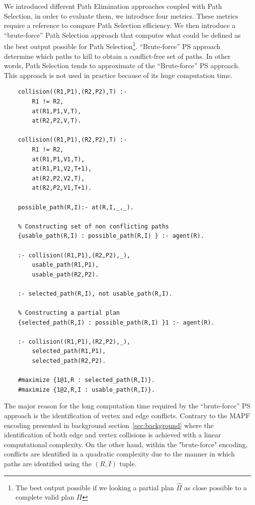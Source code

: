 We introduced different Path Elimination approaches coupled with Path  Selection, in order to evaluate them, we introduce four metrics. These metrics require a reference to compare Path Selection efficiency. We then introduce a ``brute-force'' Path Selection approach that computes what could be defined as the best output possible for Path Selection\footnote{The best output possible if we looking a partial plan \(\hat{\Pi}\) as close possible to a complete valid plan \(\Pi\)}. ``Brute-force'' PS approach determine which paths to kill to obtain a conflict-free set of paths. In other words, Path Selection tends to approximate of the ``Brute-force'' PS approach.  This approach is not used in practice because of its huge computation time.


\begin{minipage}[H]{\linewidth}
\begin{lstlisting}[style=mystyle, caption={``Brute-force'' PS approach}, label={lst:brut_force_ps_encoding}]
    % Defining collision & possible_path
    collision((R1,P1),(R2,P2),T) :- 
        R1 != R2, 
        at(R1,P1,V,T), 
        at(R2,P2,V,T).

    collision((R1,P1),(R2,P2),T) :- 
        R1 != R2, 
        at(R1,P1,V1,T), 
        at(R1,P1,V2,T+1), 
        at(R2,P2,V2,T), 
        at(R2,P2,V1,T+1).

    possible_path(R,I):- at(R,I,_,_).

    % Constructing set of non conflicting paths
    {usable_path(R,I) : possible_path(R,I) } :- agent(R).

    :- collision((R1,P1),(R2,P2),_), 
        usable_path(R1,P1), 
        usable_path(R2,P2).

    :- selected_path(R,I), not usable_path(R,I).

    % Constructing a partial plan
    {selected_path(R,I) : possible_path(R,I) }1 :- agent(R).

    :- collision((R1,P1),(R2,P2),_), 
        selected_path(R1,P1), 
        selected_path(R2,P2).

    #maximize {1@1,R : selected_path(R,I)}.
    #maximize {1@2,R,I : usable_path(R,I)}.

\end{lstlisting}
\end{minipage}

The major reason for the long computation time required by the ``brute-force'' PS approach is the identification of vertex and edge conflicts. Contrary to the MAPF encoding presented in background section~\ref{sec:background} where the identification of both edge and vertex collisions is achieved with a linear computational complexity. On the other hand, within the "brute-force" encoding, conflicts are identified in a quadratic complexity due to the manner in which paths are identified using the \((R,I)\) tuple.


